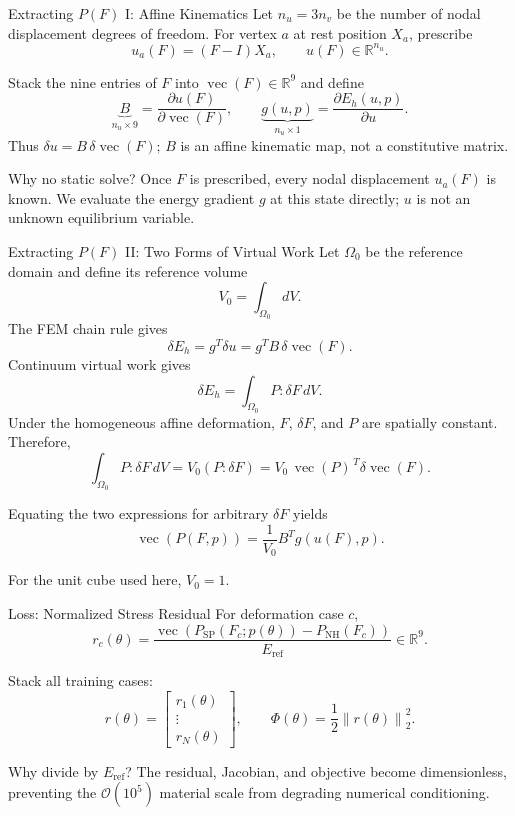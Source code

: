 \documentclass[aspectratio=169,10pt]{beamer}
\newcommand{\vect}[1]{\operatorname{vec}\!\left(#1\right)}
\newcommand{\norm}[1]{\left\lVert #1\right\rVert}
\newcommand{\eref}{E_{\mathrm{ref}}}
\begin{document}
\begin{frame}{Extracting $P(F)$ I: Affine Kinematics}
  \small
  Let $n_u=3n_v$ be the number of nodal displacement degrees of freedom.
  For vertex $a$ at rest position $X_a$, prescribe
  \[
    u_a(F)=(F-I)X_a,
    \qquad
    u(F)\in\mathbb R^{n_u}.
  \]

  Stack the nine entries of $F$ into $\vect{F}\in\mathbb R^9$ and define
  \[
    \underbrace{B}_{n_u\times9}
    =
    \frac{\partial u(F)}{\partial\vect{F}},
    \qquad
    \underbrace{g(u,p)}_{n_u\times1}
    =
    \frac{\partial E_h(u,p)}{\partial u}.
  \]
  Thus $\delta u=B\,\delta\vect{F}$; $B$ is an affine
  \alert{kinematic map}, not a constitutive matrix.

  \begin{block}{Why no static solve?}
    Once $F$ is prescribed, every nodal displacement $u_a(F)$ is known.
    We evaluate the energy gradient $g$ at this state directly; $u$ is not an
    unknown equilibrium variable.
  \end{block}
\end{frame}

\begin{frame}{Extracting $P(F)$ II: Two Forms of Virtual Work}
  \small
  Let $\Omega_0$ be the reference domain and define its reference volume
  \[
    V_0=\int_{\Omega_0}dV.
  \]
  The FEM chain rule gives
  \[
    \delta E_h
    =
    g^T\delta u
    =
    g^TB\,\delta\vect{F}.
  \]
  Continuum virtual work gives
  \[
    \delta E_h
    =
    \int_{\Omega_0}P:\delta F\,dV.
  \]
  Under the homogeneous affine deformation, $F$, $\delta F$, and $P$ are
  spatially constant. Therefore,
  \[
    \int_{\Omega_0}P:\delta F\,dV
    =
    V_0(P:\delta F)
    =
    V_0\,\vect{P}^{\,T}\delta\vect{F}.
  \]

  Equating the two expressions for arbitrary $\delta F$ yields
  \[
    \boxed{
      \vect{P(F,p)}
      =
      \frac{1}{V_0}B^Tg(u(F),p)
    }.
  \]

  For the unit cube used here, $V_0=1$.
\end{frame}

\begin{frame}{Loss: Normalized Stress Residual}
  \small
  For deformation case $c$,
  \[
    r_c(\theta)
    =
    \frac{
      \vect{P_{\mathrm{SP}}(F_c;p(\theta))
      -
      P_{\mathrm{NH}}(F_c)}
    }{\eref}
    \in\mathbb R^9.
  \]

  Stack all training cases:
  \[
    r(\theta)
    =
    \begin{bmatrix}
      r_1(\theta)\\
      \vdots\\
      r_N(\theta)
    \end{bmatrix},
    \qquad
    \boxed{
      \Phi(\theta)=\frac12\norm{r(\theta)}_2^2
    }.
  \]

  \begin{block}{Why divide by $\eref$?}
    The residual, Jacobian, and objective become dimensionless, preventing the
    $\mathcal O(10^5)$ material scale from degrading numerical conditioning.
  \end{block}
\end{frame}
\end{document}
